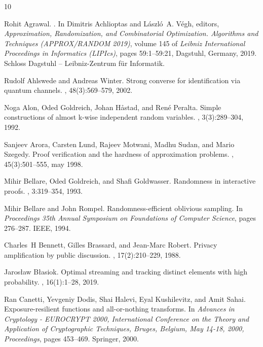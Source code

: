 \documentclass[10pt,a4paper]{article}
\newcommand{\1}{\mathbbm{1}}
\begin{document}
\begin{thebibliography}{10}

Rohit Agrawal.
.
\newblock In Dimitris Achlioptas and L\'{a}szl\'{o}~A. V\'{e}gh, editors, {\em
  Approximation, Randomization, and Combinatorial Optimization. Algorithms and
  Techniques (APPROX/RANDOM 2019)}, volume 145 of {\em Leibniz International
  Proceedings in Informatics (LIPIcs)}, pages 59:1--59:21, Dagstuhl, Germany,
  2019. Schloss Dagstuhl -- Leibniz-Zentrum f{\"u}r Informatik.

Rudolf Ahlswede and Andreas Winter.
\newblock Strong converse for identification via quantum channels.
, 48(3):569--579, 2002.

Noga Alon, Oded Goldreich, Johan H{\aa}stad, and Ren{\'e} Peralta.
\newblock Simple constructions of almost k-wise independent random variables.
, 3(3):289--304, 1992.

Sanjeev Arora, Carsten Lund, Rajeev Motwani, Madhu Sudan, and Mario Szegedy.
\newblock Proof verification and the hardness of approximation problems.
, 45(3):501–555, may 1998.

Mihir Bellare, Oded Goldreich, and Shafi Goldwasser.
\newblock Randomness in interactive proofs.
, 3:319--354, 1993.

Mihir Bellare and John Rompel.
\newblock Randomness-efficient oblivious sampling.
\newblock In {\em Proceedings 35th Annual Symposium on Foundations of Computer
  Science}, pages 276--287. IEEE, 1994.

Charles~H Bennett, Gilles Brassard, and Jean-Marc Robert.
\newblock Privacy amplification by public discussion.
, 17(2):210--229, 1988.

Jaros{\l}aw B{\l}asiok.
\newblock Optimal streaming and tracking distinct elements with high
  probability.
, 16(1):1--28, 2019.

Ran Canetti, Yevgeniy Dodis, Shai Halevi, Eyal Kushilevitz, and Amit Sahai.
\newblock Exposure-resilient functions and all-or-nothing transforms.
\newblock In {\em Advances in Cryptology - {EUROCRYPT} 2000, International
  Conference on the Theory and Application of Cryptographic Techniques, Bruges,
  Belgium, May 14-18, 2000, Proceedings}, pages 453--469. Springer, 2000.


\end{thebibliography}
\end{document}
